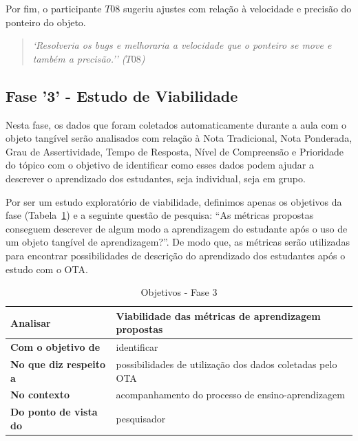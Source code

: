 Por fim, o participante $T08$ sugeriu ajustes com relação à velocidade e precisão do ponteiro do objeto.

\begin{quote}
	\textit{`Resolveria os bugs e melhoraria a velocidade que o ponteiro se move e também a precisão.'' ($T08$)}
\end{quote}



\subsection{Fase '3' - Estudo de Viabilidade}\label{subsec:fase3}

Nesta fase, os dados que foram coletados automaticamente durante a aula com o objeto tangível serão analisados com relação à Nota Tradicional, Nota Ponderada, Grau de Assertividade, Tempo de Resposta, Nível de Compreensão e Prioridade do tópico com o objetivo de identificar como esses dados podem ajudar a descrever o aprendizado dos estudantes, seja individual, seja em grupo.

Por ser um estudo exploratório de viabilidade, definimos apenas os objetivos da fase (Tabela~\ref{tab:F3_Goals}) e a seguinte questão de pesquisa: ``As métricas propostas conseguem descrever de algum modo a aprendizagem do estudante após o uso de um objeto tangível de aprendizagem?''. De modo que, as métricas serão utilizadas para encontrar possibilidades de descrição do aprendizado dos estudantes após o estudo com o OTA.

\begin{table}[htbp]
	\centering
	\caption{Objetivos - Fase 3}
	\begin{tabular}{|l|l|}
		\hline
		\textbf{Analisar}             & Viabilidade das métricas de aprendizagem propostas \\ \hline
		\textbf{Com o objetivo de}    & identificar                                        \\ \hline
		\textbf{No que diz respeito a} & possibilidades de utilização dos dados coletadas pelo OTA \\ \hline
		\textbf{No contexto}          & acompanhamento do processo de ensino-aprendizagem  \\ \hline
		\textbf{Do ponto de vista do} & pesquisador                                        \\ \hline
	\end{tabular}
	\label{tab:F3_Goals}
\end{table}

